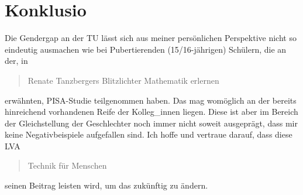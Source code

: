 \documentclass{article}
\begin{document}
\section*{Konklusio}

Die Gendergap an der TU lässt sich aus meiner persönlichen Perspektive nicht so eindeutig ausmachen wie bei Pubertierenden (15/16-jährigen) Schülern, die an der, in \blockquote{Renate Tanzbergers Blitzlichter Mathematik erlernen} erwähnten, PISA-Studie teilgenommen haben.
Das mag womöglich an der bereits hinreichend vorhandenen Reife der Kolleg\_innen liegen.
Diese ist aber im Bereich der Gleichstellung der Geschlechter noch immer nicht soweit ausgeprägt, dass mir keine Negativbeispiele aufgefallen sind.
Ich hoffe und vertraue darauf, dass diese LVA \blockquote{Technik für Menschen} seinen Beitrag leisten wird, um das zukünftig zu ändern.
\end{document}
